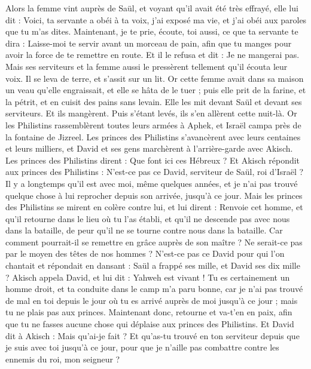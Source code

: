 \begin{multicols}{2}
Alors la femme vint auprès de Saül, et voyant qu'il avait été très effrayé, elle lui dit : Voici, ta servante a obéi à ta voix, j'ai exposé ma vie, et j'ai obéi aux paroles que tu m'as dites.
Maintenant, je te prie, écoute, toi aussi, ce que ta servante te dira : Laisse-moi te servir avant un morceau de pain, afin que tu manges pour avoir la force de te remettre en route.
Et il le refusa et dit : Je ne mangerai pas. Mais ses serviteurs et la femme aussi le pressèrent tellement qu'il écouta leur voix. Il se leva de terre, et s'assit sur un lit.
Or cette femme avait dans sa maison un veau qu'elle engraissait, et elle se hâta de le tuer ; puis elle prit de la farine, et la pétrit, et en cuisit des pains sans levain.
Elle les mit devant Saül et devant ses serviteurs. Et ils mangèrent. Puis s'étant levés, ils s'en allèrent cette nuit-là.
\VerseOne{}Or les Philistins rassemblèrent toutes leurs armées à Aphek, et Israël campa près de la fontaine de Jizreel.
Les princes des Philistins s'avancèrent avec leurs centaines et leurs milliers, et David et ses gens marchèrent à l'arrière-garde avec Akisch.
Les princes des Philistins dirent : Que font ici ces Hébreux ? Et Akisch répondit aux princes des Philistins : N'est-ce pas ce David, serviteur de Saül, roi d'Israël ? Il y a longtemps qu'il est avec moi, même quelques années, et je n'ai pas trouvé quelque chose à lui reprocher depuis son arrivée, jusqu'à ce jour.
Mais les princes des Philistins se mirent en colère contre lui, et lui dirent : Renvoie cet homme, et qu'il retourne dans le lieu où tu l'as établi, et qu'il ne descende pas avec nous dans la bataille, de peur qu'il ne se tourne contre nous dans la bataille. Car comment pourrait-il se remettre en grâce auprès de son maître ? Ne serait-ce pas par le moyen des têtes de nos hommes ?
N'est-ce pas ce David pour qui l'on chantait et répondait en dansant : Saül a frappé ses mille, et David ses dix mille ?
Akisch appela David, et lui dit : Yahweh est vivant ! Tu es certainement un homme droit, et ta conduite dans le camp m'a paru bonne, car je n'ai pas trouvé de mal en toi depuis le jour où tu es arrivé auprès de moi jusqu'à ce jour ; mais tu ne plais pas aux princes.
Maintenant donc, retourne et va-t'en en paix, afin que tu ne fasses aucune chose qui déplaise aux princes des Philistins.
Et David dit à Akisch : Mais qu'ai-je fait ? Et qu'as-tu trouvé en ton serviteur depuis que je suis avec toi jusqu'à ce jour, pour que je n'aille pas combattre contre les ennemis du roi, mon seigneur ?

\end{multicols}

